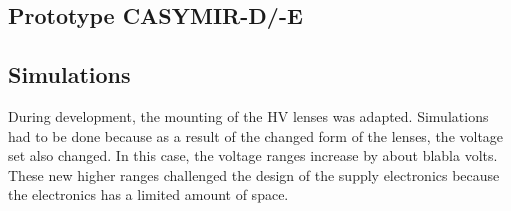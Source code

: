 	

	

	
	
	
	\subsection{Prototype CASYMIR-D/-E}
	
	\subsection{Simulations}
	
	During development, the mounting of the HV lenses was adapted. Simulations had to be done because as a result of the changed form of the lenses, the voltage set also changed. In this case, the voltage ranges increase by about blabla volts. These new higher ranges challenged the design of the supply electronics because the electronics has a limited amount of space. %
	
	
	

